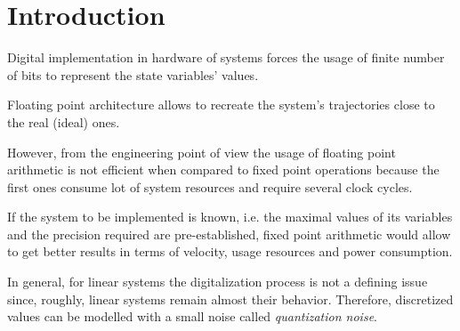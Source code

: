 \documentclass[conference]{IEEEtran}
\begin{document}
%
%
%

\section{Introduction} \label{sec:intro}

Digital implementation in hardware of systems forces the usage of
 finite number of bits to represent the state variables' values.

Floating point architecture allows to recreate the system's
trajectories close to the real (ideal) ones.

However, from the engineering point of view the usage of floating
point arithmetic is not efficient when compared to fixed point
operations because the first ones consume lot of system
resources and require several clock cycles.

If the system to be implemented is known, i.e. the maximal values
of its variables and the precision required are pre-established,
fixed point arithmetic would allow to get better results in terms
of velocity, usage resources and power consumption.

In general, for linear systems the digitalization process is not a
defining issue since, roughly, linear systems remain almost their
 behavior. Therefore, discretized values can be modelled with a small noise called \textit{quantization noise}.
\end{document}

